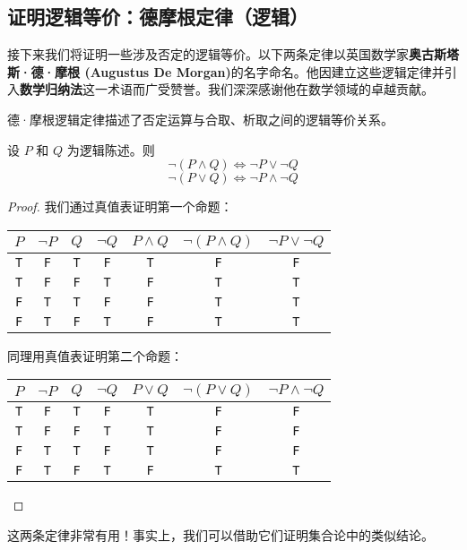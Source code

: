 \subsection{证明逻辑等价：德摩根定律（逻辑）}\label{sec:section4.6.5}

接下来我们将证明一些涉及否定的逻辑等价。以下两条定律以英国数学家\textbf{奥古斯塔斯·德·摩根 (Augustus De Morgan)}的名字命名。他因建立这些逻辑定律并引入\textbf{数学归纳法}这一术语而广受赞誉。我们深深感谢他在数学领域的卓越贡献。

德·摩根逻辑定律描述了否定运算与合取、析取之间的逻辑等价关系。

\begin{theorem}
    设 $P$ 和 $Q$ 为逻辑陈述。则
    \[\neg (P \land Q) \iff \neg P \lor \neg Q\]
    \[\neg (P \lor Q) \iff \neg P \land \neg Q\]
\end{theorem}

\begin{proof}
    我们通过真值表证明第一个命题：
    \begin{center}
        \begin{tabular}{c|c|c|c|c|c|c}
              $P$      & $\neg P$ &   $Q$   &  $\neg Q$  & $P \land Q$ & $\neg (P \land Q)$ & $\neg P \lor \neg Q$ \\
              \hline
              \verb|T| & \verb|F| & \verb|T| &  \verb|F|  &    \verb|T|    &    \verb|F|   & \verb|F| \\
              \verb|T| & \verb|F| & \verb|F| &  \verb|T|  &    \verb|F|    &    \verb|T|   & \verb|T| \\
              \verb|F| & \verb|T| & \verb|T| &  \verb|F|  &    \verb|F|    &    \verb|T|   & \verb|T| \\
              \verb|F| & \verb|T| & \verb|F| &  \verb|T|  &    \verb|F|    &    \verb|T|   & \verb|T| \\
        \end{tabular}
    \end{center}
    
    同理用真值表证明第二个命题：
    \begin{center}
        \begin{tabular}{c|c|c|c|c|c|c}
              $P$      & $\neg P$ &   $Q$    &  $\neg Q$  & $P \lor Q$ & $\neg (P \lor Q)$ & $\neg P \land \neg Q$ \\
              \hline
              \verb|T| & \verb|F| & \verb|T| &  \verb|F|  &    \verb|T|    &    \verb|F|   & \verb|F| \\
              \verb|T| & \verb|F| & \verb|F| &  \verb|T|  &    \verb|T|    &    \verb|F|   & \verb|F| \\
              \verb|F| & \verb|T| & \verb|T| &  \verb|F|  &    \verb|T|    &    \verb|F|   & \verb|F| \\
              \verb|F| & \verb|T| & \verb|F| &  \verb|T|  &    \verb|F|    &    \verb|T|   & \verb|T| \\
        \end{tabular}
    \end{center}
\end{proof}

这两条定律非常有用！事实上，我们可以借助它们证明集合论中的类似结论。
